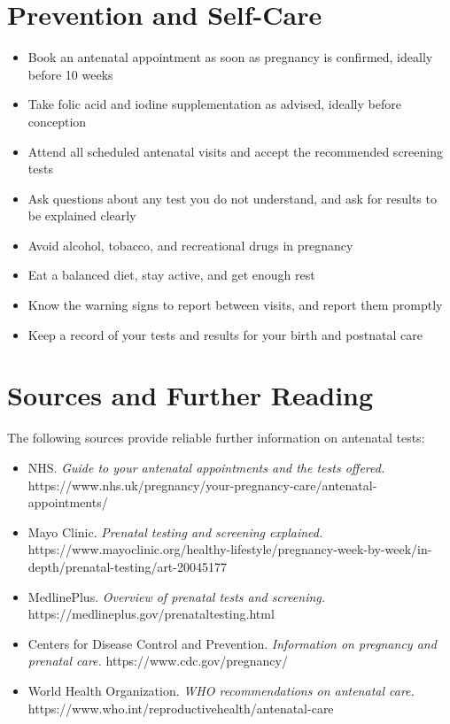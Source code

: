 \section*{Prevention and Self-Care}
\begin{itemize}
    \item Book an antenatal appointment as soon as pregnancy is confirmed, ideally before 10 weeks
    \item Take folic acid and iodine supplementation as advised, ideally before conception
    \item Attend all scheduled antenatal visits and accept the recommended screening tests
    \item Ask questions about any test you do not understand, and ask for results to be explained clearly
    \item Avoid alcohol, tobacco, and recreational drugs in pregnancy
    \item Eat a balanced diet, stay active, and get enough rest
    \item Know the warning signs to report between visits, and report them promptly
    \item Keep a record of your tests and results for your birth and postnatal care
\end{itemize}

\section*{Sources and Further Reading}
The following sources provide reliable further information on antenatal tests:

\begin{itemize}
    \item NHS. \textit{Guide to your antenatal appointments and the tests offered.} https://www.nhs.uk/pregnancy/your-pregnancy-care/antenatal-appointments/
    \item Mayo Clinic. \textit{Prenatal testing and screening explained.} https://www.mayoclinic.org/healthy-lifestyle/pregnancy-week-by-week/in-depth/prenatal-testing/art-20045177
    \item MedlinePlus. \textit{Overview of prenatal tests and screening.} https://medlineplus.gov/prenataltesting.html
    \item Centers for Disease Control and Prevention. \textit{Information on pregnancy and prenatal care.} https://www.cdc.gov/pregnancy/
    \item World Health Organization. \textit{WHO recommendations on antenatal care.} https://www.who.int/reproductivehealth/antenatal-care
\end{itemize}
